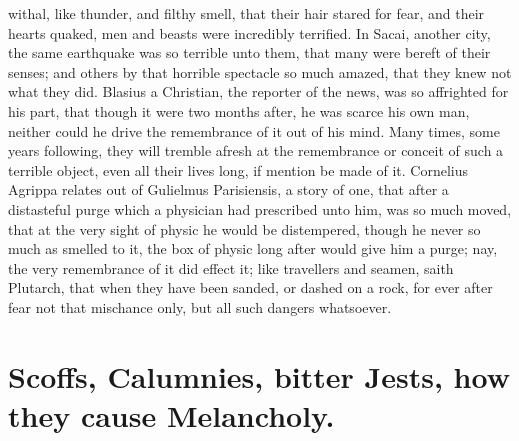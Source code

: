 {withal, like thunder, and filthy smell, that their hair stared for
fear, and their hearts quaked, men and beasts were incredibly
terrified. In Sacai, another city, the same earthquake was so terrible
unto them, that many were bereft of their senses; and others by that
horrible spectacle so much amazed, that they knew not what they did.
Blasius a Christian, the reporter of the news, was so affrighted for
his part, that though it were two months after, he was scarce his own
man, neither could he drive the remembrance of it out of his mind. Many
times, some years following, they will tremble afresh at the
remembrance or conceit of such a terrible object, even all their
lives long, if mention be made of it. Cornelius Agrippa relates out of
Gulielmus Parisiensis, a story of one, that after a distasteful purge
which a physician had prescribed unto him, was so much moved,
that at the very sight of physic he would be distempered, though
he never so much as smelled to it, the box of physic long after would
give him a purge; nay, the very remembrance of it did effect it;
like travellers and seamen, saith Plutarch, that when they have
been sanded, or dashed on a rock, for ever after fear not that
mischance only, but all such dangers whatsoever.

\section[Scoffs, bitter Jests]{Scoffs, Calumnies, bitter Jests, how they cause Melancholy.}

}

